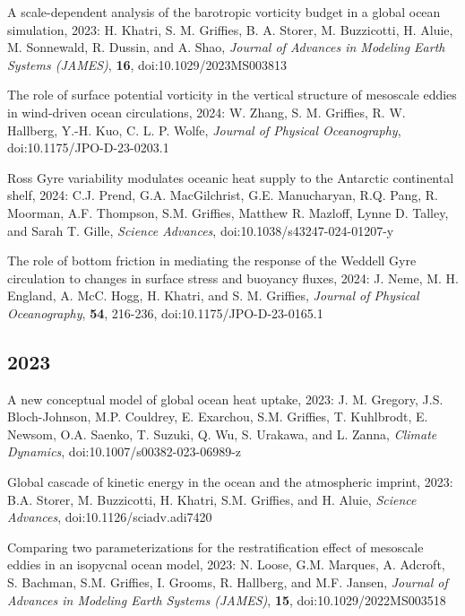 \begin{etaremune}
\item A scale-dependent analysis of the barotropic vorticity budget in a global ocean simulation, 2023: H. Khatri, S. M. Grif\/f\/ies, B. A. Storer, M. Buzzicotti, H. Aluie, M. Sonnewald, R. Dussin, and A. Shao, {\it Journal of Advances in Modeling Earth Systems (JAMES)}, {\bf 16}, doi:10.1029/2023MS003813

\item The role of surface potential vorticity in the vertical structure of mesoscale eddies in wind-driven ocean circulations, 2024: W. Zhang, S. M. Grif\/f\/ies, R. W. Hallberg, Y.-H. Kuo, C. L. P. Wolfe, {\it Journal of Physical Oceanography}, doi:10.1175/JPO-D-23-0203.1

\item Ross Gyre variability modulates oceanic heat supply to the Antarctic continental shelf, 2024: C.J. Prend, G.A. MacGilchrist, G.E. Manucharyan, R.Q. Pang, R. Moorman, A.F. Thompson, S.M. Grif\/f\/ies, Matthew R. Mazloff, Lynne D. Talley, and Sarah T. Gille, {\it Science Advances}, doi:10.1038/s43247-024-01207-y

\item  The role of bottom friction in mediating the response of the Weddell Gyre circulation to changes in surface stress and buoyancy fluxes, 2024: J. Neme, M. H. England, A. McC. Hogg, H. Khatri, and S. M. Grif\/f\/ies, {\it Journal of Physical Oceanography}, {\bf 54}, 216-236, doi:10.1175/JPO-D-23-0165.1 


\subsection*{\sc \color{Maroon} 2023}


\item A new conceptual model of global ocean heat uptake, 2023:  J. M. Gregory, J.S. Bloch-Johnson, M.P. Couldrey, E. Exarchou, S.M. Grif\/f\/ies, T. Kuhlbrodt, E. Newsom, O.A. Saenko, T. Suzuki, Q. Wu, S. Urakawa, and L. Zanna, {\it Climate Dynamics}, doi:10.1007/s00382-023-06989-z
 
\item Global cascade of kinetic energy in the ocean and the atmospheric imprint, 2023: B.A. Storer, M. Buzzicotti, H. Khatri, S.M. Grif\/f\/ies, and H. Aluie,  {\it Science Advances}, doi:10.1126/sciadv.adi7420

\item Comparing two parameterizations for the restratification effect of mesoscale eddies in an isopycnal ocean model, 2023: N. Loose, G.M. Marques, A. Adcroft, S. Bachman, S.M. Grif\/f\/ies, I. Grooms, R. Hallberg, and M.F. Jansen, {\it Journal of Advances in Modeling Earth Systems (JAMES)}, {\bf 15}, doi:10.1029/2022MS003518


\end{etaremune}
